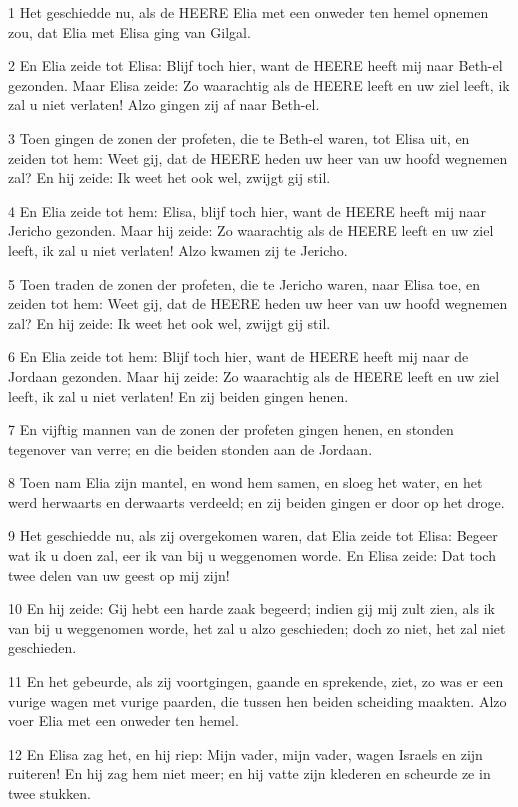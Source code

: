 \par 1 Het geschiedde nu, als de HEERE Elia met een onweder ten hemel opnemen zou, dat Elia met Elisa ging van Gilgal.
\par 2 En Elia zeide tot Elisa: Blijf toch hier, want de HEERE heeft mij naar Beth-el gezonden. Maar Elisa zeide: Zo waarachtig als de HEERE leeft en uw ziel leeft, ik zal u niet verlaten! Alzo gingen zij af naar Beth-el.
\par 3 Toen gingen de zonen der profeten, die te Beth-el waren, tot Elisa uit, en zeiden tot hem: Weet gij, dat de HEERE heden uw heer van uw hoofd wegnemen zal? En hij zeide: Ik weet het ook wel, zwijgt gij stil.
\par 4 En Elia zeide tot hem: Elisa, blijf toch hier, want de HEERE heeft mij naar Jericho gezonden. Maar hij zeide: Zo waarachtig als de HEERE leeft en uw ziel leeft, ik zal u niet verlaten! Alzo kwamen zij te Jericho.
\par 5 Toen traden de zonen der profeten, die te Jericho waren, naar Elisa toe, en zeiden tot hem: Weet gij, dat de HEERE heden uw heer van uw hoofd wegnemen zal? En hij zeide: Ik weet het ook wel, zwijgt gij stil.
\par 6 En Elia zeide tot hem: Blijf toch hier, want de HEERE heeft mij naar de Jordaan gezonden. Maar hij zeide: Zo waarachtig als de HEERE leeft en uw ziel leeft, ik zal u niet verlaten! En zij beiden gingen henen.
\par 7 En vijftig mannen van de zonen der profeten gingen henen, en stonden tegenover van verre; en die beiden stonden aan de Jordaan.
\par 8 Toen nam Elia zijn mantel, en wond hem samen, en sloeg het water, en het werd herwaarts en derwaarts verdeeld; en zij beiden gingen er door op het droge.
\par 9 Het geschiedde nu, als zij overgekomen waren, dat Elia zeide tot Elisa: Begeer wat ik u doen zal, eer ik van bij u weggenomen worde. En Elisa zeide: Dat toch twee delen van uw geest op mij zijn!
\par 10 En hij zeide: Gij hebt een harde zaak begeerd; indien gij mij zult zien, als ik van bij u weggenomen worde, het zal u alzo geschieden; doch zo niet, het zal niet geschieden.
\par 11 En het gebeurde, als zij voortgingen, gaande en sprekende, ziet, zo was er een vurige wagen met vurige paarden, die tussen hen beiden scheiding maakten. Alzo voer Elia met een onweder ten hemel.
\par 12 En Elisa zag het, en hij riep: Mijn vader, mijn vader, wagen Israels en zijn ruiteren! En hij zag hem niet meer; en hij vatte zijn klederen en scheurde ze in twee stukken.
